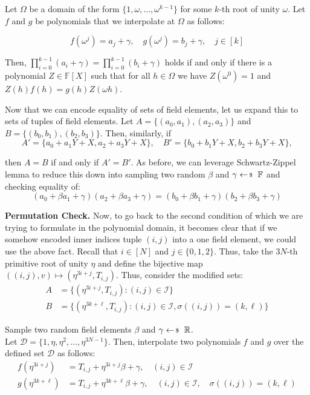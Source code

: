 \documentclass[../../book.tex]{subfiles}
\begin{document}
Let $\Omega$ be a domain of the form \(\{1, \omega, \dots, \omega^{k-1}\}\) for
some $k$-th root of unity $\omega$. Let $f$ and $g$ be polynomials that we
interpolate at $\Omega$ as follows:

\begin{equation*}
    f(\omega^j) = a_j + \gamma, \quad g(\omega^j) = b_j + \gamma, \quad j \in [k]
\end{equation*}

Then, \(\prod_{i=0}^{k-1} (a_i + \gamma) = \prod_{i=0}^{k-1} (b_i + \gamma)\) holds if and only if there is a polynomial $Z \in \mathbb{F}[X]$ such that for all $h \in \Omega$ we have $Z(\omega^{0}) = 1$ and $Z(h)f(h) = g(h)Z(\omega h)$.

Now that we can encode equality of sets of field elements, let us expand this to sets of tuples of field elements. Let \(A = \{(a_0, a_1), (a_2, a_3)\}\) and \(B = \{(b_0, b_1), (b_2, b_3)\}\). Then, similarly, if
\[A' = \{a_0 + a_1Y + X, a_2 + a_3Y + X\}, \quad B' = \{b_0 + b_1Y + X, b_2 + b_3Y + X\},\]

then $A=B$ if and only if $A'=B'$. As before, we can leverage Schwartz-Zippel lemma to reduce this down into sampling two random $\beta$ and $\gamma \leftarrowS \mathbb{F}$ and checking equality of:
\begin{equation*}
    (a_0 + \beta a_1 + \gamma)(a_2 + \beta a_3 + \gamma) = (b_0 + \beta b_1 + \gamma)(b_2 + \beta b_3 + \gamma)
\end{equation*}

\textbf{Permutation Check.} Now, to go back to the second condition of
 which we are trying to formulate in the polynomial
domain, it becomes clear that if we somehow encoded inner indices tuple $(i, j)$
into a one field element, we could use the above fact. Recall that $i \in [N]$
and $j \in \{0,1,2\}$. Thus, take the $3N$-th primitive root of unity $\eta$ and
define the bijective map $((i,j),v) \mapsto (\eta^{3i+j}, T_{i,j})$. Thus,
consider the modified sets:
\begin{align*}
    A &= \{(\eta^{3i+j}, T_{i,j}) : (i, j) \in \mathcal{I}\} \\
    B &= \{(\eta^{3k+\ell}, T_{i,j}) : (i, j) \in \mathcal{I}, \sigma((i, j)) = (k, \ell)\}
\end{align*}

Sample two random field elements $\beta$ and $\gamma \leftarrowS \mathbb{R}$. \\
Let $\mathcal{D} = \{1, \eta, \eta^2, \ldots, \eta^{3N-1}\}$. Then, interpolate two 
polynomials $f$ and $g$ over the defined set $\mathcal{D}$ as follows:
\begin{align*}
    f(\eta^{3i+j}) &= T_{i,j} + \eta^{3i+j}\beta + \gamma, \quad (i, j) \in \mathcal{I} \\
    g(\eta^{3k+\ell}) &= T_{i,j} + \eta^{3k+\ell}\beta + \gamma, \quad (i, j) \in \mathcal{I}, \quad \sigma((i, j)) = (k, \ell)
\end{align*}
\end{document}
